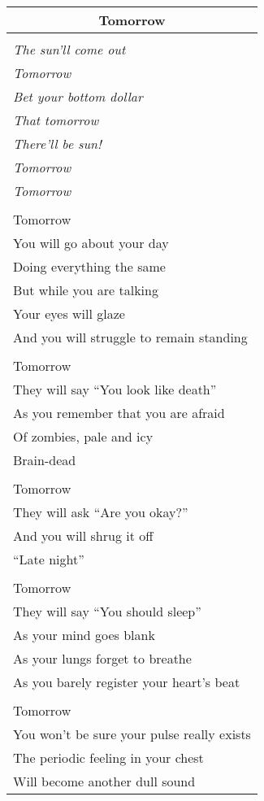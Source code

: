 \documentclass{article}
\begin{document}
\begin{center}
\begin{tabular}{l}
\multicolumn{1}{c}{\textbf{Tomorrow}} \\ \hline
\\
\textit{The sun'll come out} \\
\textit{Tomorrow} \\
\textit{Bet your bottom dollar} \\
\textit{That tomorrow} \\
\textit{There'll be sun!} \\
\hspace*{2ex}\textit{Tomorrow} \\
\hspace*{4ex}\textit{Tomorrow} \\
\\
Tomorrow \\
You will go about your day \\
Doing everything the same \\
But while you are talking \\
Your eyes will glaze \\
And you will struggle to remain standing \\
\\
Tomorrow \\
They will say ``You look like death'' \\
As you remember that you are afraid \\
Of zombies, pale and icy \\
Brain-dead \\
\\
Tomorrow \\
They will ask ``Are you okay?'' \\
And you will shrug it off \\
``Late night'' \\
\\
Tomorrow \\
They will say ``You should sleep'' \\
As your mind goes blank \\
As your lungs forget to breathe \\
As you barely register your heart's beat \\
\\
Tomorrow \\
You won't be sure your pulse really exists \\
The periodic feeling in your chest \\
Will become another dull sound \\

\end{tabular}
\end{center}
\end{document}
